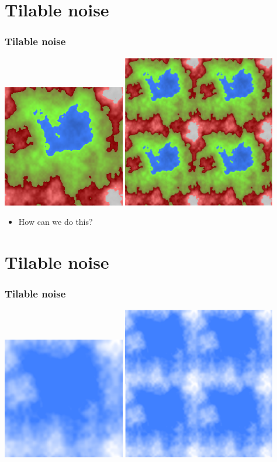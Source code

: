 \documentclass[slidestop,xcolor=pst,dvips]{beamer}
\newcommand{\sect}[1]{
\section{#1}
\begin{frame}[fragile]\frametitle{#1}
}
\begin{document}
\sect{Tilable noise}
\includegraphics[width=0.4\textwidth]{terrain.eps}
\hfill
\includegraphics[width=0.5\textwidth]{tiledterrain.eps}
\begin{itemize}
\item How can we do this?
\end{itemize}
\end{frame}

\sect{Tilable noise}
\includegraphics[width=0.4\textwidth]{sky.eps}
\hfill
\includegraphics[width=0.5\textwidth]{tiledsky.eps}
\end{frame}
\end{document}

